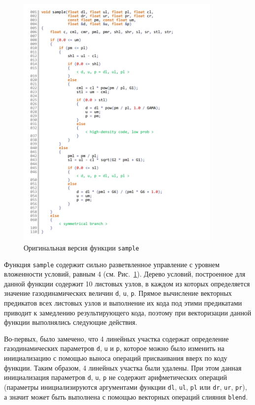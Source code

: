 \documentclass[utf8]{psta}
\begin{document}
\begin{figure}
\includegraphics[width=10cm]{pics/pic_sample_code_4}
\caption{Оригинальная версия функции \texttt{sample}}
\label{pic:sample_code_4}
\end{figure}

Функция \texttt{sample} содержит сильно разветвленное управление с уровнем вложенности условий, равным 4 (см. Рис.~\ref{pic:sample_code_4}).
Дерево условий, построенное для данной функции содержит 10 листовых узлов, в каждом из которых определяется значение газодинамических величин \texttt{d}, \texttt{u}, \texttt{p}.
Прямое вычисление векторных предикатов всех листовых узлов и выполнение их кода под этими предикатами приводит к замедлению результирующего кода, поэтому при векторизации данной функции выполнялись следующие действия.

Во-первых, было замечено, что 4 линейных участка содержат определение газодинамических параметров \texttt{d}, \texttt{u} и \texttt{p}, которое можно было изменить на инициализацию с помощью выноса операций присваивания вверх по коду функции.
Таким образом, 4 линейных участка были удалены.
При этом данная инициализация параметров \texttt{d}, \texttt{u}, \texttt{p} не содержит арифметических операций (параметры инициализируются аргументами функции \texttt{dl}, \texttt{ul}, \texttt{pl} или \texttt{dr}, \texttt{ur}, \texttt{pr}), а значит может быть выполнена с помощью векторных операций слияния \texttt{blend}.
\end{document}
